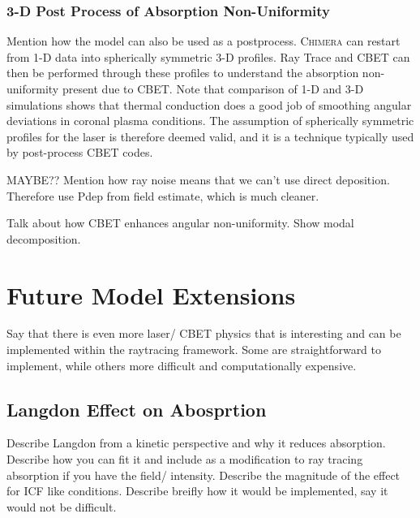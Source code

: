 \subsubsection{3-D Post Process of Absorption Non-Uniformity}

Mention how the model can also be used as a postprocess.
\textsc{Chimera} can restart from 1-D data into spherically symmetric 3-D profiles.
Ray Trace and CBET can then be performed through these profiles to understand the absorption non-uniformity present due to CBET.
Note that comparison of 1-D and 3-D simulations shows that thermal conduction does a good job of smoothing angular deviations in coronal plasma conditions.
The assumption of spherically symmetric profiles for the laser is therefore deemed valid, and it is a technique typically used by post-process CBET codes.

MAYBE??
Mention how ray noise means that we can't use direct deposition.
Therefore use Pdep from field estimate, which is much cleaner.

Talk about how CBET enhances angular non-uniformity.
Show modal decomposition.


\section{Future Model Extensions}

Say that there is even more laser/ CBET physics that is interesting and can be implemented within the raytracing framework.
Some are straightforward to implement, while others more difficult and computationally expensive.

\subsection{Langdon Effect on Abosprtion}

Describe Langdon from a kinetic perspective and why it reduces absorption.
Describe how you can fit it and include as a modification to ray tracing absorption if you have the field/ intensity.
Describe the magnitude of the effect for ICF like conditions.
Describe breifly how it would be implemented, say it would not be difficult.

